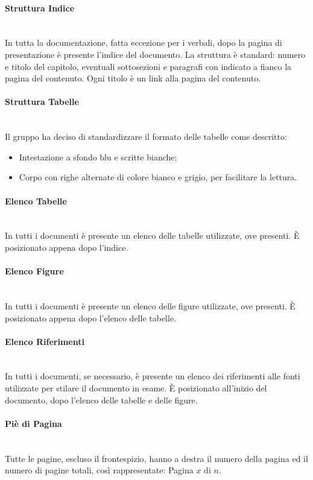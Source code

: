 \paragraph{Struttura Indice} \-\\
In tutta la documentazione, fatta eccezione per i verbali, dopo la pagina di presentazione è presente l'indice del documento. La struttura è standard: numero e titolo del capitolo, eventuali sottosezioni e paragrafi con indicato a fianco la pagina del contenuto. Ogni titolo è un link alla pagina del contenuto.

\paragraph{Struttura Tabelle} \-\\
Il gruppo ha deciso di standardizzare il formato delle tabelle come descritto:
\begin{itemize}
	\item Intestazione a sfondo blu e scritte bianche;
	\item Corpo con righe alternate di colore bianco e grigio, per facilitare la lettura.
\end{itemize}

\paragraph{Elenco Tabelle} \-\\
In tutti i documenti è presente un elenco delle tabelle utilizzate, ove presenti. È posizionato appena dopo l'indice.

\paragraph{Elenco Figure} \-\\
In tutti i documenti è presente un elenco delle figure utilizzate, ove presenti. È posizionato appena dopo l'elenco delle tabelle.

\paragraph{Elenco Riferimenti} \-\\
In tutti i documenti, se necessario, è presente un elenco dei riferimenti alle fonti utilizzate per stilare il documento in esame. È posizionato all'inizio del documento, dopo l'elenco delle tabelle e delle figure.

\paragraph{Piè di Pagina} \-\\
Tutte le pagine, escluso il frontespizio, hanno a destra il numero della pagina ed il numero di pagine totali, così rappresentate: Pagina $x$ di $n$.


